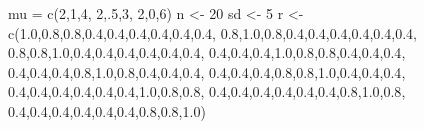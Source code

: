 \documentclass[
]{book}
\newenvironment{Shaded}{\begin{snugshade}}{\end{snugshade}}
\newcommand{\DecValTok}[1]{\textcolor[rgb]{0.00,0.00,0.81}{#1}}
\newcommand{\FloatTok}[1]{\textcolor[rgb]{0.00,0.00,0.81}{#1}}
\newcommand{\FunctionTok}[1]{\textcolor[rgb]{0.00,0.00,0.00}{#1}}
\newcommand{\NormalTok}[1]{#1}
\newcommand{\OtherTok}[1]{\textcolor[rgb]{0.56,0.35,0.01}{#1}}
\begin{document}
\begin{Shaded}
\begin{Highlighting}[]
\NormalTok{mu }\OtherTok{=} \FunctionTok{c}\NormalTok{(}\DecValTok{2}\NormalTok{,}\DecValTok{1}\NormalTok{,}\DecValTok{4}\NormalTok{,}
       \DecValTok{2}\NormalTok{,.}\DecValTok{5}\NormalTok{,}\DecValTok{3}\NormalTok{,}
       \DecValTok{2}\NormalTok{,}\DecValTok{0}\NormalTok{,}\DecValTok{6}\NormalTok{) }
\NormalTok{n }\OtherTok{\textless{}{-}} \DecValTok{20}
\NormalTok{sd }\OtherTok{\textless{}{-}} \DecValTok{5}
\NormalTok{r }\OtherTok{\textless{}{-}} \FunctionTok{c}\NormalTok{(}\FloatTok{1.0}\NormalTok{,}\FloatTok{0.8}\NormalTok{,}\FloatTok{0.8}\NormalTok{,}\FloatTok{0.4}\NormalTok{,}\FloatTok{0.4}\NormalTok{,}\FloatTok{0.4}\NormalTok{,}\FloatTok{0.4}\NormalTok{,}\FloatTok{0.4}\NormalTok{,}\FloatTok{0.4}\NormalTok{,}
       \FloatTok{0.8}\NormalTok{,}\FloatTok{1.0}\NormalTok{,}\FloatTok{0.8}\NormalTok{,}\FloatTok{0.4}\NormalTok{,}\FloatTok{0.4}\NormalTok{,}\FloatTok{0.4}\NormalTok{,}\FloatTok{0.4}\NormalTok{,}\FloatTok{0.4}\NormalTok{,}\FloatTok{0.4}\NormalTok{,}
       \FloatTok{0.8}\NormalTok{,}\FloatTok{0.8}\NormalTok{,}\FloatTok{1.0}\NormalTok{,}\FloatTok{0.4}\NormalTok{,}\FloatTok{0.4}\NormalTok{,}\FloatTok{0.4}\NormalTok{,}\FloatTok{0.4}\NormalTok{,}\FloatTok{0.4}\NormalTok{,}\FloatTok{0.4}\NormalTok{,}
       \FloatTok{0.4}\NormalTok{,}\FloatTok{0.4}\NormalTok{,}\FloatTok{0.4}\NormalTok{,}\FloatTok{1.0}\NormalTok{,}\FloatTok{0.8}\NormalTok{,}\FloatTok{0.8}\NormalTok{,}\FloatTok{0.4}\NormalTok{,}\FloatTok{0.4}\NormalTok{,}\FloatTok{0.4}\NormalTok{,}
       \FloatTok{0.4}\NormalTok{,}\FloatTok{0.4}\NormalTok{,}\FloatTok{0.4}\NormalTok{,}\FloatTok{0.8}\NormalTok{,}\FloatTok{1.0}\NormalTok{,}\FloatTok{0.8}\NormalTok{,}\FloatTok{0.4}\NormalTok{,}\FloatTok{0.4}\NormalTok{,}\FloatTok{0.4}\NormalTok{,}
       \FloatTok{0.4}\NormalTok{,}\FloatTok{0.4}\NormalTok{,}\FloatTok{0.4}\NormalTok{,}\FloatTok{0.8}\NormalTok{,}\FloatTok{0.8}\NormalTok{,}\FloatTok{1.0}\NormalTok{,}\FloatTok{0.4}\NormalTok{,}\FloatTok{0.4}\NormalTok{,}\FloatTok{0.4}\NormalTok{,}
       \FloatTok{0.4}\NormalTok{,}\FloatTok{0.4}\NormalTok{,}\FloatTok{0.4}\NormalTok{,}\FloatTok{0.4}\NormalTok{,}\FloatTok{0.4}\NormalTok{,}\FloatTok{0.4}\NormalTok{,}\FloatTok{1.0}\NormalTok{,}\FloatTok{0.8}\NormalTok{,}\FloatTok{0.8}\NormalTok{,}
       \FloatTok{0.4}\NormalTok{,}\FloatTok{0.4}\NormalTok{,}\FloatTok{0.4}\NormalTok{,}\FloatTok{0.4}\NormalTok{,}\FloatTok{0.4}\NormalTok{,}\FloatTok{0.4}\NormalTok{,}\FloatTok{0.8}\NormalTok{,}\FloatTok{1.0}\NormalTok{,}\FloatTok{0.8}\NormalTok{,}
       \FloatTok{0.4}\NormalTok{,}\FloatTok{0.4}\NormalTok{,}\FloatTok{0.4}\NormalTok{,}\FloatTok{0.4}\NormalTok{,}\FloatTok{0.4}\NormalTok{,}\FloatTok{0.4}\NormalTok{,}\FloatTok{0.8}\NormalTok{,}\FloatTok{0.8}\NormalTok{,}\FloatTok{1.0}\NormalTok{)}



\end{Highlighting}
\end{Shaded}
\end{document}
